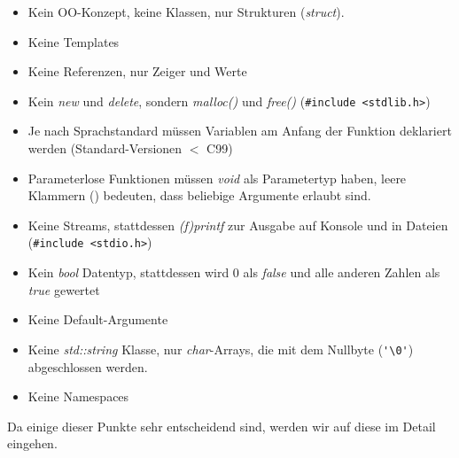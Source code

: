 \begin{itemize}
	\item Kein OO-Konzept, keine Klassen, nur Strukturen (\emph{struct}).
	\item Keine Templates
	\item Keine Referenzen, nur Zeiger und Werte
	\item Kein \emph{new} und \emph{delete}, sondern \emph{malloc()} und \emph{free()} (\verb|#include <stdlib.h>|)
	\item Je nach Sprachstandard müssen Variablen am Anfang der Funktion deklariert werden (Standard-Versionen $<$ C99)
	\item Parameterlose Funktionen müssen \emph{void} als Parametertyp haben, leere Klammern () bedeuten, dass beliebige Argumente erlaubt sind.
	\item Keine Streams, stattdessen \emph{(f)printf} zur Ausgabe auf Konsole und in Dateien (\verb|#include <stdio.h>|)
	\item Kein \emph{bool} Datentyp, stattdessen wird 0 als \emph{false} und alle anderen Zahlen als \emph{true} gewertet
	\item Keine Default-Argumente
	\item Keine \emph{std::string} Klasse, nur \emph{char}-Arrays, die mit dem Nullbyte (\verb|'\0'|) abgeschlossen werden.
	\item Keine Namespaces
\end{itemize}

Da einige dieser Punkte sehr entscheidend sind, werden wir auf diese im Detail eingehen.

